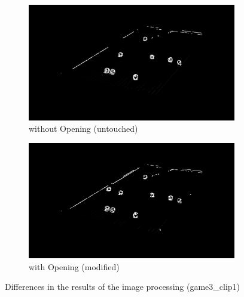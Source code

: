 \begin{figure}[h]
    \centering
    \begin{subfigure}[b]{0.45\textwidth}
        \centering
        \includegraphics[width=\textwidth]{imgs/ball_localization/final_first.jpg}
        \caption{without Opening (untouched)}
    \end{subfigure}
    \hspace{0.05\textwidth}
    \begin{subfigure}[b]{0.45\textwidth}
        \centering
        \includegraphics[width=\textwidth]{imgs/ball_localization/final_second.jpg}
        \caption{with Opening (modified)}
    \end{subfigure}
    \caption{Differences in the results of the image processing (game3\_clip1)}
    \label{fig:opening}
\end{figure}

